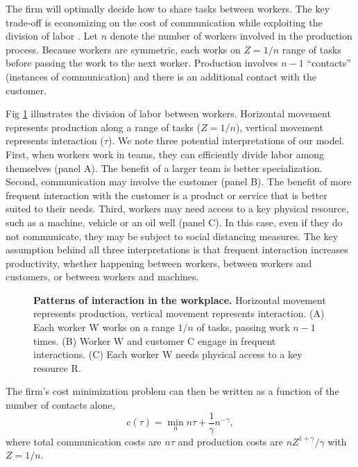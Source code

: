 The firm will optimally decide how to share tasks between workers. The key trade-off is economizing on the cost of communication while exploiting the division of labor \cite{Becker1992-ac}. Let $n$ denote the number of workers involved in the production process. Because workers are symmetric, each works on $Z=1/n$ range of tasks before passing the work to the next worker. Production involves $n-1$ ``contacts'' (instances of communication) and there is an additional contact with the customer. 

Fig \ref{fig1} illustrates the division of labor between workers. Horizontal movement represents production along a range of tasks ($Z=1/n$), vertical movement represents interaction ($\tau$). We note three potential interpretations of our model. First, when workers work in teams, they can efficiently divide labor among themselves (panel A). The benefit of a larger team is better specialization. Second, communication may involve the customer (panel B). The benefit of more frequent interaction with the customer is a product or service that is better suited to their needs. Third, workers may need access to a key physical resource, such as a machine, vehicle or an oil well (panel C). In this case, even if they do not communicate, they may be subject to social distancing measures. The key assumption behind all three interpretations is that frequent interaction increases productivity, whether happening between workers, between workers and customers, or between workers and machines.

\begin{figure}[!h]
\plos{}

\caption{{\bf Patterns of interaction in the workplace.}
Horizontal movement represents production, vertical movement represents interaction. (A) Each worker W works on a range $1/n$ of tasks, passing work $n-1$ times. (B) Worker W and customer C engage in frequent interactions. (C) Each worker W needs physical access to a key resource R.}
\label{fig1}
\end{figure}

The firm's cost minimization problem can then be written as a function of the number of contacts alone,
\begin{equation}\label{TC}
	c(\tau) = \min_n n\tau + \frac 1\gamma n^{-\gamma},
\end{equation}
where total communication costs are $n\tau$ and production costs are $n Z^{1+\gamma}/\gamma$ with $Z=1/n$.

